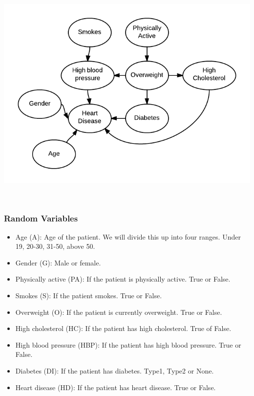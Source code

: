\documentclass{article}
\begin{document}
\begin{minipage}{\linewidth}
\begin{center}
\includegraphics[scale=0.5]{part3_bn}
\end{center}
\end{minipage}\\

\subsubsection{Random Variables}
\begin{itemize}
\item Age (A): Age of the patient. We will divide this up into four ranges. Under 19, 20-30, 31-50, above 50.
\item Gender (G): Male or female.
\item Physically active (PA): If the patient is physically active. True or False.
\item Smokes (S): If the patient smokes. True or False.
\item Overweight (O): If the patient is currently overweight. True or False.
\item High cholesterol (HC): If the patient has high cholesterol. True of False.
\item High blood pressure (HBP): If the patient has high blood pressure. True or False.
\item Diabetes (DI): If the patient has diabetes. Type1, Type2 or None.
\item Heart disease (HD): If the patient has heart disease. True or False.
\end{itemize} 
\end{document}
